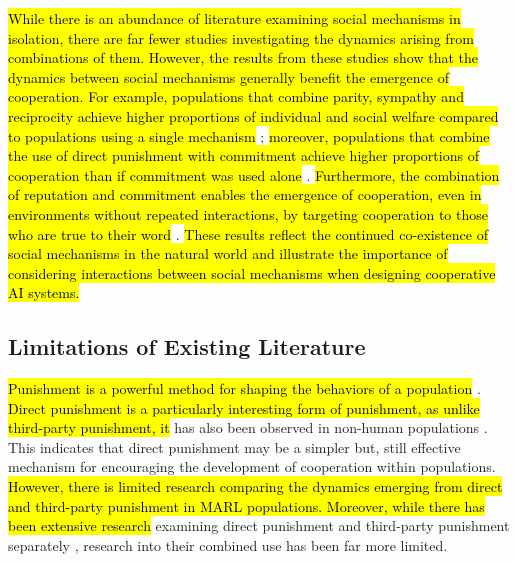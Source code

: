 \documentclass[sn-aps,numbered]{sn-jnl}%
\theoremstyle{thmstyleone}%
\theoremstyle{thmstyletwo}%
\theoremstyle{thmstylethree}%
\begin{document}
\hl{While there is an abundance of literature examining social mechanisms in isolation, there are far fewer studies investigating the dynamics arising from combinations of them. However, the results from these studies show that the dynamics between social mechanisms generally benefit the emergence of cooperation. For example, populations that combine parity, sympathy and reciprocity achieve higher proportions of individual and social welfare compared to populations using a single mechanism} \citep{parity_sympathy_reciprocity}; \hl{moreover, populations that combine the use of direct punishment with commitment achieve higher proportions of cooperation than if commitment was used alone} \citep{punishment_coop_commitment, synergy_intention_commitment}. \hl{Furthermore, the combination of reputation and commitment enables the emergence of cooperation, even in environments without repeated interactions, by targeting cooperation to those who are true to their word} \citep{krellner2023words}. \hl{These results reflect the continued co-existence of social mechanisms in the natural world and illustrate the importance of considering interactions between social mechanisms when designing cooperative AI systems.} 

\subsection{Limitations of Existing Literature}

\hl{Punishment is a powerful method for shaping the behaviors of a population} \citep{boyd1992punishment}. \hl{Direct punishment is a particularly interesting form of punishment, as unlike third-party punishment, it} has also been observed in non-human populations \citep{Redhead2021, tpp_4_year_olds}. This indicates that direct punishment may be a simpler but, still effective mechanism for encouraging the development of cooperation within populations. \hl{However, there is limited research comparing the dynamics emerging from direct and third-party punishment in MARL populations. Moreover, while there has been extensive research} examining direct punishment \citep{Dreber2008, Chen2020} and third-party punishment separately \citep{Raihani2015_tpp_rewarded_helpers, tpp_4_year_olds, learning_social_norms_punish, silly_rules_ssd, learning_to_penalise_other_agents, hughes2018inequity}, research into their combined use has been far more limited.
\end{document}
